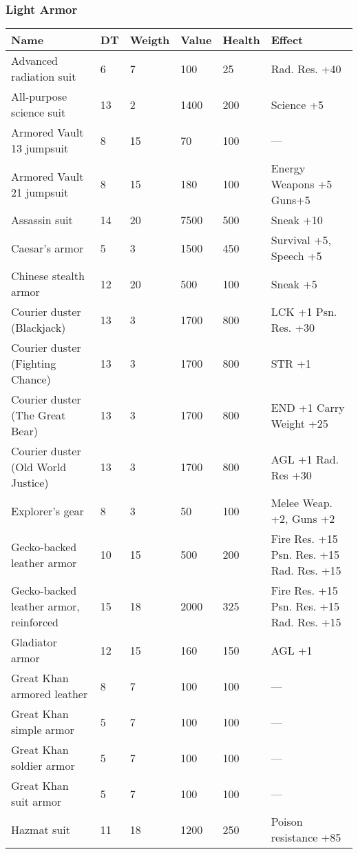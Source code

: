 
\subsubsection{Light Armor}
\begin{longtable}{|p{4cm}|p{1.2cm}|p{1.2cm}|p{1.2cm}|p{1.2cm}|p{4cm}|}
\hline
\bfseries Name & \bfseries DT & \bfseries Weigth & \bfseries Value & \bfseries Health & \bfseries Effect \\
\hline
\endhead
Advanced radiation suit  & 6 & 7 & 100 & 25 & Rad. Res. +40  \\
All-purpose science suit  & 13 & 2 & 1400 & 200 & Science +5  \\
Armored Vault 13 jumpsuit  & 8 & 15 & 70 & 100 & —  \\
Armored Vault 21 jumpsuit  & 8 & 15 & 180 & 100 & Energy Weapons +5 Guns+5  \\
Assassin suit  & 14 & 20 & 7500 & 500 & Sneak +10  \\
Caesar's armor  & 5 & 3 & 1500 & 450 & Survival +5, Speech +5  \\
Chinese stealth armor  & 12 & 20 & 500 & 100 & Sneak +5  \\
Courier duster (Blackjack)  & 13 & 3 & 1700 & 800 & LCK +1 Psn. Res. +30  \\
Courier duster (Fighting Chance)  & 13 & 3 & 1700 & 800 & STR +1  \\
Courier duster (The Great Bear)  & 13 & 3 & 1700 & 800 & END +1 Carry Weight +25  \\
Courier duster (Old World Justice)  & 13 & 3 & 1700 & 800 & AGL +1 Rad. Res +30  \\
Explorer's gear  & 8 & 3 & 50 & 100 & Melee Weap. +2, Guns +2  \\
Gecko-backed leather armor  & 10 & 15 & 500 & 200 & Fire Res. +15 Psn. Res. +15 Rad. Res. +15  \\
Gecko-backed leather armor, reinforced  & 15 & 18 & 2000 & 325 & Fire Res. +15 Psn. Res. +15 Rad. Res. +15  \\
Gladiator armor  & 12 & 15 & 160 & 150 & AGL +1  \\
Great Khan armored leather  & 8 & 7 & 100 & 100 & —  \\
Great Khan simple armor  & 5 & 7 & 100 & 100 & —  \\
Great Khan soldier armor  & 5 & 7 & 100 & 100 & —  \\
Great Khan suit armor  & 5 & 7 & 100 & 100 & —  \\
Hazmat suit  & 11 & 18 & 1200 & 250 & Poison resistance +85  \\

\end{longtable}
